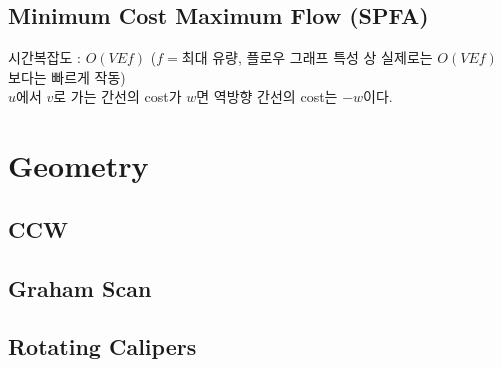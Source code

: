 \documentclass[10pt,landscape,a4paper,twocolumn]{article}
\begin{document}
\subsection{Minimum Cost Maximum Flow (SPFA)}
시간복잡도 : $O(VEf)$ \hspace{1em} ($f=$최대 유량, 플로우 그래프 특성 상 실제로는 $O(VEf)$ 보다는 빠르게 작동)\\
\hspace{1em}$u$에서 $v$로 가는 간선의 cost가 $w$면 역방향 간선의 cost는 $-w$이다.



%
%


\section{Geometry}
\subsection{CCW}


\iffalse
\subsection{Vector Class}

\fi

\subsection{Graham Scan}


\subsection{Rotating Calipers}

\end{document}
